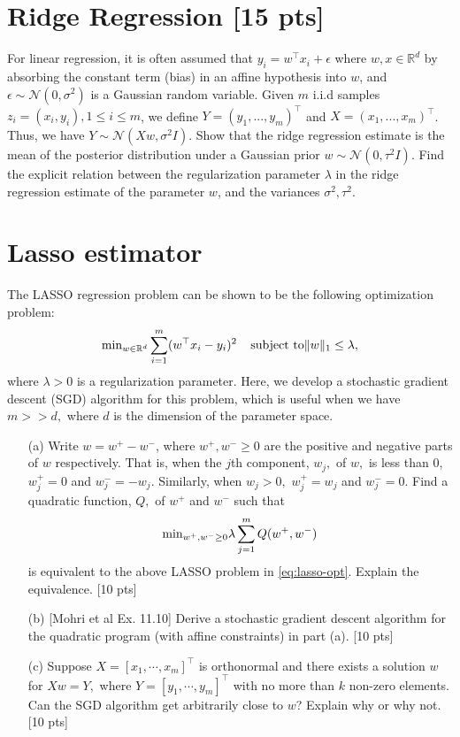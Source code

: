 \documentclass[12pt]{article}
\begin{document}
\section{Ridge Regression [15 pts]}

For linear regression, it is often assumed that $y_i = w^\top x_i + \epsilon$ where $w, x \in \mathbb{R}^d$ by absorbing the constant term (bias) in an affine hypothesis into $w$, and $\epsilon \sim \mathcal{N} (0, \sigma^2)$ is a Gaussian random variable. Given $m$ i.i.d samples $z_i = (x_i, y_i), 1\leq i\leq m$, we define $Y = (y_1, ..., y_m)^\top$ and $X = (x_1, ..., x_m)^\top$. Thus, we have $Y \sim \mathcal{N} (Xw, \sigma^2 I)$. Show that the ridge regression estimate is the mean of the posterior distribution under a Gaussian prior $w \sim \mathcal{N} (0, \tau^2 I)$. Find the explicit relation between the regularization parameter $\lambda$ in the ridge regression estimate of the parameter $w$, and the variances $\sigma^2, \tau^2$.


\section{Lasso estimator}
The LASSO regression problem can be shown to be the following optimization problem:
\begin{equation}
	\label{eq:lasso-opt}
	{\rm min}_{w \in \mathbb{R}^d} \sum_{i=1}^m (w^\top x_i - y_i)^2 \;\;\;\; \text{subject to} \|w\|_1 \leq \lambda,
\end{equation}
where $\lambda > 0$ is a regularization parameter. Here, we develop a stochastic gradient descent (SGD) algorithm for this problem, which is useful when we have $m >> d,$ where $d$ is the dimension of the parameter space.
\begin{itemize}
	\item[(a)] Write $w = w^+ - w^-$, where $w^+, w^- \geq 0$ are the positive and negative parts of $w$ respectively. That is, when the $j$th component, $w_j,$ of $w,$ is less than 0, $w^+_j = 0$ and $w^-_j = -w_j.$ Similarly, when $w_j > 0,$ $w^+_j = w_j$ and $w^-_j = 0.$ Find a quadratic function, $Q,$ of $w^+$ and $w^-$ such that
	\begin{equation}
		{\rm min}_{w^+, w^- \geq 0} \lambda \sum_{j=1}^m Q(w^+, w^-)
	\end{equation}
	is equivalent to the above LASSO problem in \eqref{eq:lasso-opt}. Explain the equivalence. [10 pts]
\item[(b)] [Mohri et al Ex. 11.10] Derive a stochastic gradient descent algorithm for the quadratic program (with affine constraints) in part (a). [10 pts] 
\item[(c)] Suppose $X = [x_1, \cdots, x_m]^\top$ is orthonormal and there exists a solution $w$ for $Xw = Y,$ where $Y = [y_1,\cdots, y_m]^\top$ with no more than $k$ non-zero elements. Can the SGD algorithm get arbitrarily close to $w$? Explain why or why not. [10 pts]    
\end{itemize}
\end{document}
